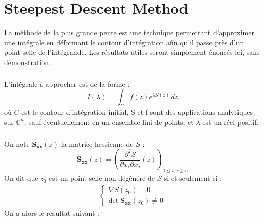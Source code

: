 \chapter{Steepest Descent Method}
\label{PhaseStationnaire}


La méthode de la plus grande pente est une technique permettant d'approximer une intégrale en déformant le contour d'intégration afin qu'il passe près d'un point-selle de l'intégrande. Les résultats utiles seront simplement énoncés ici, sans démonstration. 
\paragraph{}
L'intégrale à approcher est de la forme :
\begin{equation}
I(\lambda)=\int_C f(z)e^{\lambda S(z)}\,dz
\end{equation}
où $C$ est le contour d'intégration initial, S et f sont des applications analytiques sur $\mathbb{C}^n$, sauf éventuellement en un ensemble fini de points,  et $\lambda$ est un réel positif.

\paragraph{}
On note $\mathbf{S_{xx}}(z)$ la matrice hessienne de $S$ :
\begin{equation}
\mathbf{S_{xx}}(z)=\left( \frac{\partial^2 S}{\partial x_i \partial x_j}(z) \right)_{1\leq i,j \leq n}
\end{equation}
On dit que $z_ 0$ est un point-selle non-dégénéré de $S$ si et seulement si :
\begin{eqnarray}
\left\{
\begin{array}{l}
\nabla S(z_0)=0 \\
\mbox{det} \; \mathbf{S_{xx}}(z_0) \neq 0
\end{array}
\right.
\end{eqnarray}
On a alors le résultat suivant :

